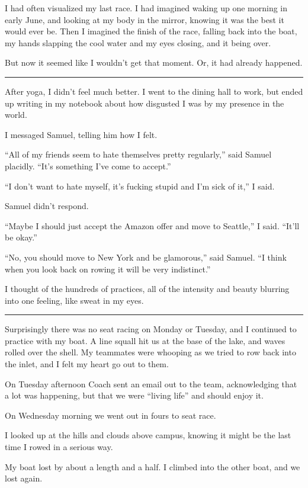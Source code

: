 I had often visualized my last race.  I had imagined waking up one morning in
early June, and looking at my body in the mirror, knowing it was the best it
would ever be.  Then I imagined the finish of the race, falling back into the
boat, my hands slapping the cool water and my eyes closing, and it being over.

But now it seemed like I wouldn't get that moment.  Or, it had already happened.

\plainfancybreak{12pt}{2}{}

After yoga, I didn't feel much better.  I went to the dining hall to work, but
ended up writing in my notebook about how disgusted I was by my presence in the
world.

I messaged Samuel, telling him how I felt.

``All of my friends seem to hate themselves pretty regularly,'' said Samuel
placidly.  ``It's something I've come to accept.''

``I don't want to hate myself, it's fucking stupid and I'm sick of it,'' I said.  

Samuel didn't respond.

``Maybe I should just accept the Amazon offer and move to Seattle,'' I said.
``It'll be okay.''

``No, you should move to New York and be glamorous,'' said Samuel.  ``I think
when you look back on rowing it will be very indistinct.'' 

I thought of the hundreds of practices, all of the intensity and beauty blurring
into one feeling, like sweat in my eyes.

\plainfancybreak{12pt}{2}{}

Surprisingly there was no seat racing on Monday or Tuesday, and I continued to
practice with my boat.  A line squall hit us at the base of the lake, and waves
rolled over the shell.  My teammates were whooping as we tried to row back into
the inlet, and I felt my heart go out to them.

On Tuesday afternoon Coach sent an email out to the team, acknowledging that a
lot was happening, but that we were ``living life'' and should enjoy it.

On Wednesday morning we went out in fours to seat race.

I looked up at the hills and clouds above campus, knowing it might be the last
time I rowed in a serious way.  

My boat lost by about a length and a half.  I climbed into the other boat, and
we lost again.

